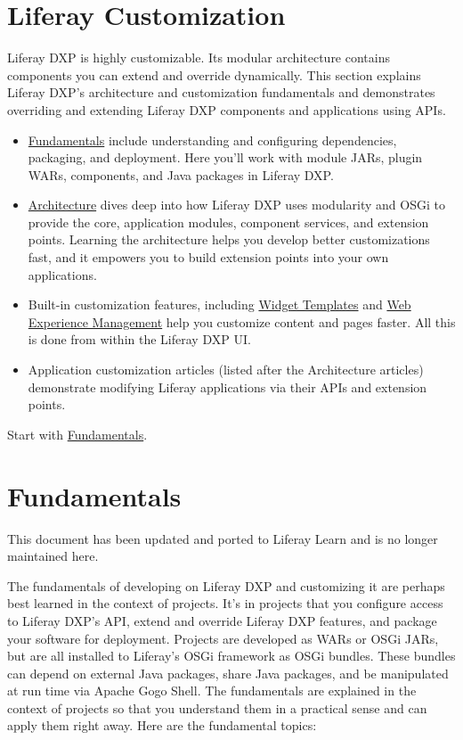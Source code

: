 \chapter{Liferay Customization}\label{liferay-customization}

Liferay DXP is highly customizable. Its modular architecture contains
components you can extend and override dynamically. This section
explains Liferay DXP's architecture and customization fundamentals and
demonstrates overriding and extending Liferay DXP components and
applications using APIs.

\begin{itemize}
\item
  \href{/docs/7-2/customization/-/knowledge_base/c/fundamentals}{Fundamentals}
  include understanding and configuring dependencies, packaging, and
  deployment. Here you'll work with module JARs, plugin WARs,
  components, and Java packages in Liferay DXP.
\item
  \href{/docs/7-2/customization/-/knowledge_base/c/architecture}{Architecture}
  dives deep into how Liferay DXP uses modularity and OSGi to provide
  the core, application modules, component services, and extension
  points. Learning the architecture helps you develop better
  customizations fast, and it empowers you to build extension points
  into your own applications.
\item
  Built-in customization features, including
  \href{/docs/7-2/user/-/knowledge_base/u/styling-widgets-with-widget-templates}{Widget
  Templates} and
  \href{/docs/7-2/user/-/knowledge_base/u/web-experience-management}{Web
  Experience Management} help you customize content and pages faster.
  All this is done from within the Liferay DXP UI.
\item
  Application customization articles (listed after the Architecture
  articles) demonstrate modifying Liferay applications via their APIs
  and extension points.
\end{itemize}

Start with
\href{/docs/7-2/customization/-/knowledge_base/c/fundamentals}{Fundamentals}.

\chapter{Fundamentals}\label{fundamentals}

{ This document has been updated and ported to Liferay Learn and is no
longer maintained here.}

The fundamentals of developing on Liferay DXP and customizing it are
perhaps best learned in the context of projects. It's in projects that
you configure access to Liferay DXP's API, extend and override Liferay
DXP features, and package your software for deployment. Projects are
developed as WARs or OSGi JARs, but are all installed to Liferay's OSGi
framework as OSGi bundles. These bundles can depend on external Java
packages, share Java packages, and be manipulated at run time via Apache
Gogo Shell. The fundamentals are explained in the context of projects so
that you understand them in a practical sense and can apply them right
away. Here are the fundamental topics:

